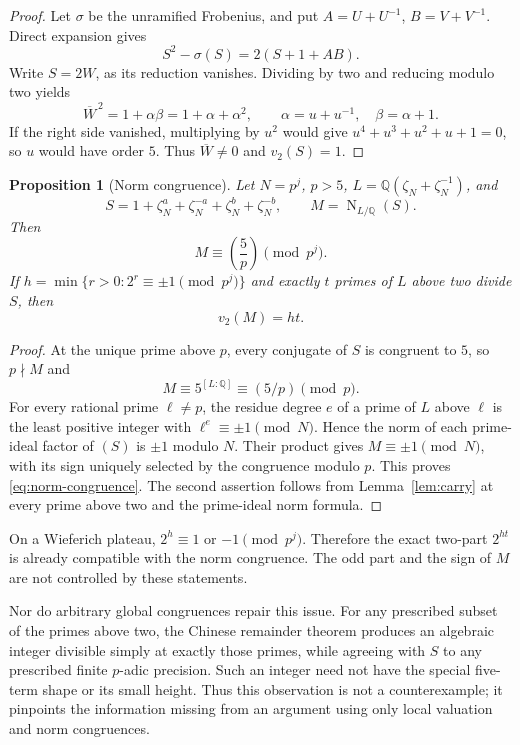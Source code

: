 \documentclass[a4paper]{article}
\newtheorem{proposition}[theorem]{Proposition}
\DeclareMathOperator{\Nm}{N}
\newcommand{\Q}{\mathbb Q}
\begin{document}
\begin{proof}
Let $\sigma$ be the unramified Frobenius, and put
$A=U+U^{-1}$, $B=V+V^{-1}$.
Direct expansion gives
\[
 S^2-\sigma(S)=2(S+1+AB).
\]
Write $S=2W$, as its reduction vanishes.
Dividing by two and reducing modulo two yields
\[
 \overline W^{\,2}=1+\alpha\beta
 =1+\alpha+\alpha^2,\qquad
 \alpha=u+u^{-1},\quad\beta=\alpha+1.
\]
If the right side vanished, multiplying by $u^2$ would give
$u^4+u^3+u^2+u+1=0$, so $u$ would have order $5$.
Thus $\overline W\ne0$ and $v_2(S)=1$.
\end{proof}

\begin{proposition}[Norm congruence]\label{prop:norm}
Let $N=p^j$, $p>5$, $L=\Q(\zeta_N+\zeta_N^{-1})$, and
\[
 S=1+\zeta_N^a+\zeta_N^{-a}+\zeta_N^b+\zeta_N^{-b},
 \qquad M=\Nm_{L/\Q}(S).
\]
Then
\begin{equation}\label{eq:norm-congruence}
 M\equiv\left(\frac5p\right)\pmod{p^j}.
\end{equation}
If $h=\min\{r>0:2^r\equiv\pm1\pmod{p^j}\}$ and exactly $t$ primes
of $L$ above two divide $S$, then
\[
 v_2(M)=ht.
\]
\end{proposition}

\begin{proof}
At the unique prime above $p$, every conjugate of $S$ is congruent
to $5$, so $p\nmid M$ and
\[
 M\equiv5^{[L:\Q]}\equiv(5/p)\pmod p.
\]
For every rational prime $\ell\ne p$, the residue degree $e$ of a
prime of $L$ above $\ell$ is the least positive integer with
$\ell^e\equiv\pm1\pmod N$.
Hence the norm of each prime-ideal factor of $(S)$ is $\pm1$
modulo $N$.  Their product gives $M\equiv\pm1\pmod N$, with its sign
uniquely selected by the congruence modulo $p$.
This proves \eqref{eq:norm-congruence}.
The second assertion follows from Lemma~\ref{lem:carry} at every
prime above two and the prime-ideal norm formula.
\end{proof}

On a Wieferich plateau, $2^h\equiv1$ or $-1\pmod{p^j}$.
Therefore the exact two-part $2^{ht}$ is already compatible with
the norm congruence.  The odd part and the sign of $M$ are not
controlled by these statements.

Nor do arbitrary global congruences repair this issue.
For any prescribed subset of the primes above two, the Chinese
remainder theorem produces an algebraic integer divisible simply at
exactly those primes, while agreeing with $S$ to any prescribed
finite $p$-adic precision.
Such an integer need not have the special five-term shape or its
small height.  Thus this observation is not a counterexample; it
pinpoints the information missing from an argument using only local
valuation and norm congruences.
\end{document}

